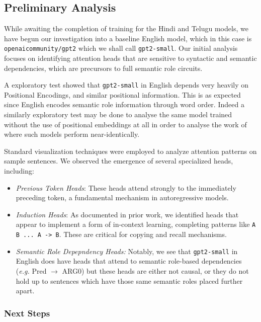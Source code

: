 \documentclass[11pt]{article}
\begin{document}
\subsection*{Preliminary Analysis}
\label{sec:orgc39795a}

While awaiting the completion of training for the Hindi and Telugu models, we have begun our investigation into a baseline English model, which in this case is \texttt{openaicommunity/gpt2} which we shall call \texttt{gpt2-small}. Our initial analysis focuses on identifying attention heads that are sensitive to syntactic and semantic dependencies, which are precursors to full semantic role circuits.

A exploratory test showed that \texttt{gpt2-small} in English depends very heavily on Positional Encodings, and similar positional information. This is as expected since English encodes semantic role information through word order. Indeed a similarly exploratory test may be done to analyse the same model trained without the use of positional embeddings at all in order to analyse the work of \citet{haviv.etal2022} where such models perform near-identically.

Standard visualization techniques were employed to analyze attention patterns on sample sentences. We observed the emergence of several specialized heads, including:

\begin{itemize}
\item \emph{Previous Token Heads}: These heads attend strongly to the immediately preceding token, a fundamental mechanism in autoregressive models.
\item \emph{Induction Heads}: As documented in prior work, we identified heads that appear to implement a form of in-context learning, completing patterns like \texttt{A B ... A -> B}. These are critical for copying and recall mechanisms.
\item \emph{Semantic Role Depepndency Heads:} Notably, we see that \texttt{gpt2-small} in English does have heads that attend to semantic role-based dependencies (\emph{e.g.} Pred \(\rightarrow\) ARG0) but these heads are either not causal, or they do not hold up to sentences which have those same semantic roles placed further apart.
\end{itemize}
\subsubsection*{Next Steps}
\label{sec:org65fbd89}
\end{document}
